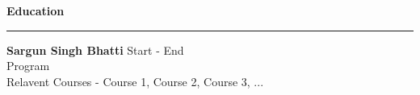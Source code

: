 

\textbf{Education}

\par\noindent\rule{\textwidth}{0.2pt}


\textbf{Sargun Singh Bhatti} \hfill {Start - End} \\
{Program} \\
{Relavent Courses} - {Course 1, Course 2, Course 3, ...} \\
